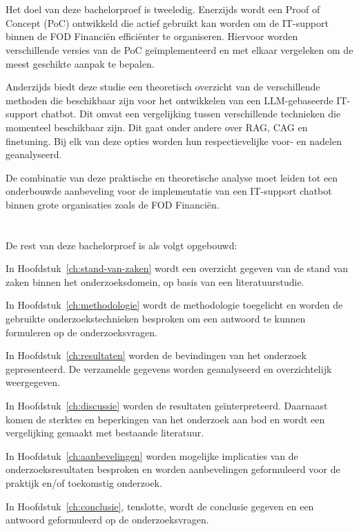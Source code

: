 \section{}%
\label{sec:onderzoeksdoelstelling}

Het doel van deze bachelorproef is tweeledig. Enerzijds wordt een Proof of Concept (PoC) ontwikkeld die actief gebruikt kan worden om de IT-support binnen de FOD Financiën efficiënter te organiseren. Hiervoor worden verschillende versies van de PoC geïmplementeerd en met elkaar vergeleken om de meest geschikte aanpak te bepalen.

Anderzijds biedt deze studie een theoretisch overzicht van de verschillende methoden die beschikbaar zijn voor het ontwikkelen van een LLM-gebaseerde IT-support chatbot. Dit omvat een vergelijking tussen verschillende technieken die momenteel beschikbaar zijn. Dit gaat onder andere over RAG, CAG en finetuning. Bij elk van deze opties worden hun respectievelijke voor- en nadelen geanalyseerd.

De combinatie van deze praktische en theoretische analyse moet leiden tot een onderbouwde aanbeveling voor de implementatie van een IT-support chatbot binnen grote organisaties zoals de FOD Financiën.

\section{}%
\label{sec:opzet-bachelorproef}

De rest van deze bachelorproef is als volgt opgebouwd:

In Hoofdstuk~\ref{ch:stand-van-zaken} wordt een overzicht gegeven van de stand van zaken binnen het onderzoeksdomein, op basis van een literatuurstudie.

In Hoofdstuk~\ref{ch:methodologie} wordt de methodologie toegelicht en worden de gebruikte onderzoekstechnieken besproken om een antwoord te kunnen formuleren op de onderzoeksvragen.

In Hoofdstuk~\ref{ch:resultaten} worden de bevindingen van het onderzoek gepresenteerd. De verzamelde gegevens worden geanalyseerd en overzichtelijk weergegeven.

In Hoofdstuk~\ref{ch:discussie} worden de resultaten geïnterpreteerd. Daarnaast komen de sterktes en beperkingen van het onderzoek aan bod en wordt een vergelijking gemaakt met bestaande literatuur.

In Hoofdstuk~\ref{ch:aanbevelingen} worden mogelijke implicaties van de onderzoeksresultaten besproken en worden aanbevelingen geformuleerd voor de praktijk en/of toekomstig onderzoek.

In Hoofdstuk~\ref{ch:conclusie}, tenslotte, wordt de conclusie gegeven en een antwoord geformuleerd op de onderzoeksvragen.